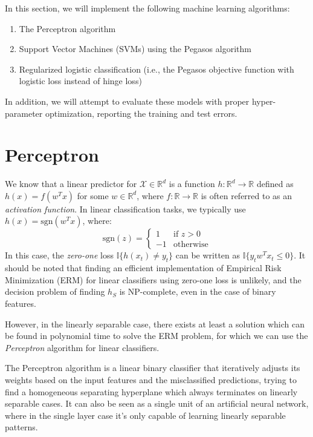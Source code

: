 
In this section, we will implement the following machine learning algorithms:

\begin{enumerate}
    \item The Perceptron algorithm
    \item Support Vector Machines (SVMs) using the Pegasos algorithm
    \item Regularized logistic classification (i.e., the Pegasos objective function with logistic loss instead of hinge loss)
\end{enumerate}

In addition, we will attempt to evaluate these models with proper hyper-parameter optimization, reporting the training and test errors.

\section{Perceptron}

We know that a linear predictor for $\mathcal{X} \in \mathbb{R}^d$ is a function $h: \mathbb{R}^d \rightarrow \mathbb{R}$ defined as $h(x) = f(w^Tx)$ for some $w \in \mathbb{R}^d$, where $f: \mathbb{R} \rightarrow \mathbb{R}$ is often referred to as an \textit{activation function}. In linear classification tasks, we typically use $h(x) = \text{sgn}(w^Tx)$, where:
\begin{equation}
    \text{sgn}(z) = \begin{cases}
                        1 & \text{if } z > 0 \\
                        -1 & \text{otherwise}
                    \end{cases}
\end{equation}
In this case, the \textit{zero-one} loss $\mathbb{I}\{h(x_t) \neq y_t\}$ can be written as $\mathbb{I}\{y_t w^T x_t \leq 0 \}$. It should be noted that finding an efficient implementation of Empirical Risk Minimization (ERM) for linear classifiers using zero-one loss is unlikely, and the decision problem of finding $h_S$ is NP-complete, even in the case of binary features.

However, in the linearly separable case, there exists at least a solution which can be found in polynomial time to solve the ERM problem, for which we can use the \textit{Perceptron} algorithm for linear classifiers.

The Perceptron algorithm is a linear binary classifier that iteratively adjusts its weights based on the input features and the misclassified predictions, trying to find a homogeneous separating hyperplane which always terminates on linearly separable cases. It can also be seen as a single unit of an artificial neural network, where in the single layer case it's only capable of learning linearly separable patterns.

